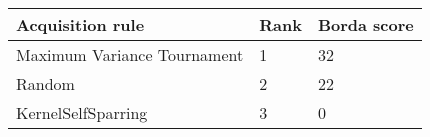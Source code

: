 \begin{tabular}{lll}
Acquisition rule & Rank & Borda score \\ 
\hline 
Maximum Variance Tournament        & 1 & 32 \\ 
Random                             & 2 & 22 \\ 
KernelSelfSparring \citep{Sui2017} & 3 & 0 \\ 
\hline 
\end{tabular}